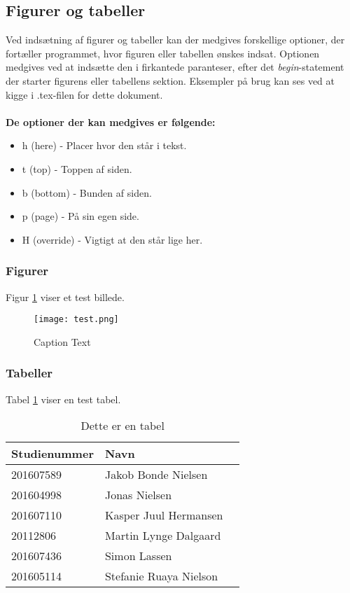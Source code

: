 \subsection{Figurer og tabeller}
Ved indsætning af figurer og tabeller kan der medgives forskellige optioner, der fortæller programmet, hvor figuren eller tabellen ønskes indsat. Optionen medgives ved at indsætte den i firkantede paranteser, efter det \textit{begin}-statement der starter figurens eller tabellens sektion. Eksempler på brug kan ses ved at kigge i .tex-filen for dette dokument.\\
\medskip\\
\textbf{De optioner der kan medgives er følgende:}
\begin{itemize}
	\item h (here) - Placer hvor den står i tekst.
	\item t (top) - Toppen af siden.
	\item b (bottom) - Bunden af siden.
	\item p (page) - På sin egen side.
	\item H (override) - Vigtigt at den står lige her.
\end{itemize}

\newpage
\subsubsection{Figurer}
Figur \ref{fig:eksempel_test} viser et test billede.
\begin{figure}[H]
	\center
	\texttt{[image: test.png]}
	\caption{Caption Text}
	\label{fig:eksempel_test}
\end{figure}

\subsubsection{Tabeller}
Tabel \ref{tab:eksempel_tabel} viser en test tabel.
\begin{table}[H]
	\centering
	\caption{Dette er en tabel}
	\begin{tabular}{|l|l|l|}
		\hline
		\rowcolor{gray!50}
		\textbf{Studienummer} & \textbf{Navn}\\ [5px]
		\hline
		201607589 & Jakob Bonde Nielsen\\
		\hline
		201604998 & Jonas Nielsen\\
		\hline
		201607110 & Kasper Juul Hermansen\\
		\hline
		20112806 & Martin Lynge Dalgaard\\
		\hline
		201607436 & Simon Lassen\\
		\hline
		201605114 & Stefanie Ruaya Nielson\\
		\hline
	\end{tabular}
	\label{tab:eksempel_tabel}
\end{table}

